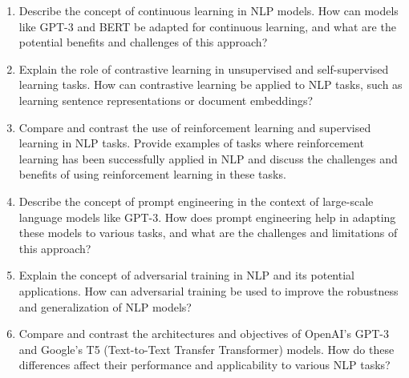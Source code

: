 \documentclass[12pt]{article}
\begin{document}
\begin{enumerate}
  \item Describe the concept of continuous learning in NLP models. How can models like GPT-3 and BERT be adapted for continuous learning, and what are the potential benefits and challenges of this approach?
  \item Explain the role of contrastive learning in unsupervised and self-supervised learning tasks. How can contrastive learning be applied to NLP tasks, such as learning sentence representations or document embeddings?
  \item Compare and contrast the use of reinforcement learning and supervised learning in NLP tasks. Provide examples of tasks where reinforcement learning has been successfully applied in NLP and discuss the challenges and benefits of using reinforcement learning in these tasks.
  \item Describe the concept of prompt engineering in the context of large-scale language models like GPT-3. How does prompt engineering help in adapting these models to various tasks, and what are the challenges and limitations of this approach?
  \item Explain the concept of adversarial training in NLP and its potential applications. How can adversarial training be used to improve the robustness and generalization of NLP models?
  \item Compare and contrast the architectures and objectives of OpenAI's GPT-3 and Google's T5 (Text-to-Text Transfer Transformer) models. How do these differences affect their performance and applicability to various NLP tasks?
\end{enumerate}
\end{document}
